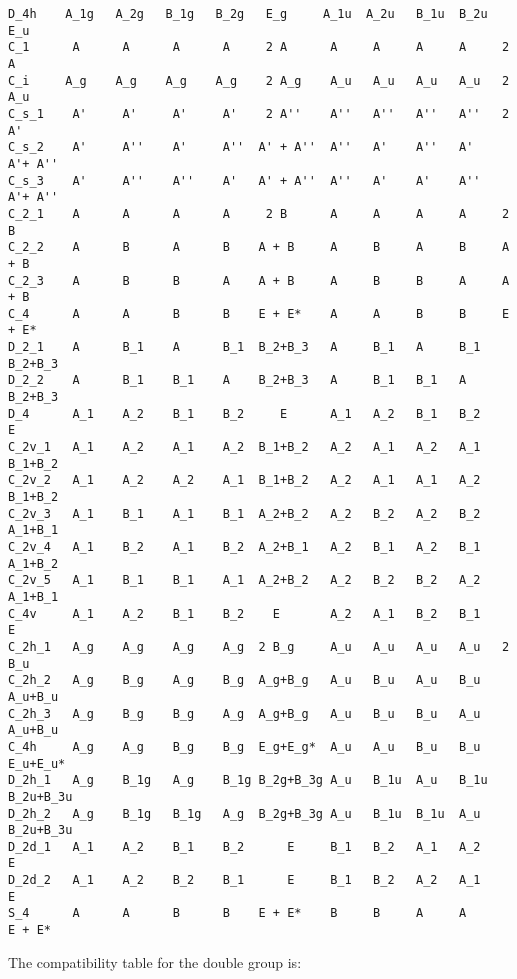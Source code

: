 \documentclass[12pt,a4paper,twoside]{report}
\begin{document}
\begin{tcolorbox}
\begin{scriptsize}
\begin{verbatim}
D_4h    A_1g   A_2g   B_1g   B_2g   E_g     A_1u  A_2u   B_1u  B_2u  E_u
C_1      A      A      A      A     2 A      A     A     A     A     2 A
C_i     A_g    A_g    A_g    A_g    2 A_g    A_u   A_u   A_u   A_u   2 A_u
C_s_1    A'     A'     A'     A'    2 A''    A''   A''   A''   A''   2 A'
C_s_2    A'     A''    A'     A''  A' + A''  A''   A'    A''   A'    A'+ A''
C_s_3    A'     A''    A''    A'   A' + A''  A''   A'    A'    A''   A'+ A''
C_2_1    A      A      A      A     2 B      A     A     A     A     2 B
C_2_2    A      B      A      B    A + B     A     B     A     B     A + B 
C_2_3    A      B      B      A    A + B     A     B     B     A     A + B
C_4      A      A      B      B    E + E*    A     A     B     B     E + E*    
D_2_1    A      B_1    A      B_1  B_2+B_3   A     B_1   A     B_1   B_2+B_3
D_2_2    A      B_1    B_1    A    B_2+B_3   A     B_1   B_1   A     B_2+B_3
D_4      A_1    A_2    B_1    B_2     E      A_1   A_2   B_1   B_2     E 
C_2v_1   A_1    A_2    A_1    A_2  B_1+B_2   A_2   A_1   A_2   A_1   B_1+B_2
C_2v_2   A_1    A_2    A_2    A_1  B_1+B_2   A_2   A_1   A_1   A_2   B_1+B_2
C_2v_3   A_1    B_1    A_1    B_1  A_2+B_2   A_2   B_2   A_2   B_2   A_1+B_1
C_2v_4   A_1    B_2    A_1    B_2  A_2+B_1   A_2   B_1   A_2   B_1   A_1+B_2
C_2v_5   A_1    B_1    B_1    A_1  A_2+B_2   A_2   B_2   B_2   A_2   A_1+B_1
C_4v     A_1    A_2    B_1    B_2    E       A_2   A_1   B_2   B_1     E
C_2h_1   A_g    A_g    A_g    A_g  2 B_g     A_u   A_u   A_u   A_u   2 B_u
C_2h_2   A_g    B_g    A_g    B_g  A_g+B_g   A_u   B_u   A_u   B_u   A_u+B_u
C_2h_3   A_g    B_g    B_g    A_g  A_g+B_g   A_u   B_u   B_u   A_u   A_u+B_u
C_4h     A_g    A_g    B_g    B_g  E_g+E_g*  A_u   A_u   B_u   B_u   E_u+E_u*
D_2h_1   A_g    B_1g   A_g    B_1g B_2g+B_3g A_u   B_1u  A_u   B_1u  B_2u+B_3u
D_2h_2   A_g    B_1g   B_1g   A_g  B_2g+B_3g A_u   B_1u  B_1u  A_u   B_2u+B_3u
D_2d_1   A_1    A_2    B_1    B_2      E     B_1   B_2   A_1   A_2      E  
D_2d_2   A_1    A_2    B_2    B_1      E     B_1   B_2   A_2   A_1      E
S_4      A      A      B      B    E + E*    B     B     A     A      E + E* 
\end{verbatim}
\end{scriptsize}
\end{tcolorbox}

The compatibility table for the double group is:
\end{document}
